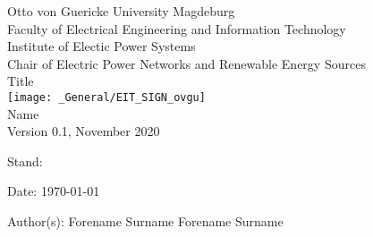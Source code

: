 %
\begin{titlepage}
    \begin{center}
        \normalsize
        Otto von Guericke University Magdeburg \\
        Faculty of Electrical Engineering and Information Technology \\
        Institute of Electic Power Systems \\
        Chair of Electric Power Networks and Renewable Energy Sources\\
        \vspace{1cm} %
        \huge
        Title \\
        \vspace{1.5cm} %
        \texttt{[image: \_General/EIT\_SIGN\_ovgu]} \\
        \vspace{1cm} %
        \Large
        Name  \\
        \vspace{1cm} %
        \tiny Version 0.1, November 2020     
    \end{center}    
    \normalsize
    \vfill %
    \begin{labeling}{Stand: }
        \item[Date:] \tabto{1cm} \today
        \item
        \item[Author(s):] \tabto{1cm} Forename Surname 
                          \tabto{1cm} Forename Surname
    \end{labeling}
\end{titlepage}
